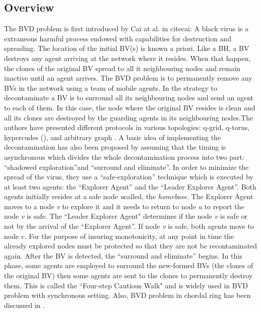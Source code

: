 \subsection{Overview}
The BVD problem is first introduced by Cai at al. in cite{cai}: A black virus is a  extraneous harmful process endowed with capabilities for destruction and spreading. The location of the initial BV(s) is known a priori. Like a BH, a BV destroys any agent arriving at the network where it resides. When that happen, the clones of the original BV spread to all it neighbouring nodes and remain inactive until an agent arrives. The BVD problem is to permanently remove any BVs in the network using a team of mobile agents. In \cite{cai}  the strategy to decontaminate a BV is to surround all its neighbouring nodes and send an agent to each of them. In this case, the node where the original BV resides is clean and all its clones are destroyed by the guarding agents in its neighbouring nodes.The authors have presented different protocols in various topologies: q-grid, q-torus, hypercudes  (\cite{cai}), and arbitrary graph \cite{cai1}. A basic idea of implementing the decontamination has also been proposed  by   assuming that the timing is asynchronous which divides the whole decontamination process into two part: ``shadowed exploration''and ``surround and eliminate''. In order to minimize the spread of the virus, they use a ``safe-exploration'' technique which is executed by at least two agents: the ``Explorer Agent'' and the ``Leader Explorer Agent''. Both agents  initially resides at a safe node {\em u}called, the {\em homebase}. The Explorer Agent moves to a node {\em v} to explore it and it needs to return to node {\em u} to report the node {\em v} is safe. The ``Leader Explorer Agent" determines if the node {\em v} is safe or not by the arrival of the ``Explorer Agent''. If node {\em v} is safe, both agents move to node $v$. For the purpose of insuring monotonicity, at any point in time the already explored nodes must be protected so that they are not be recontaminated again. After the BV is detected, the ``surround and eliminate'' begins. In this phase, some agents are employed to surround the new-formed BVs (the clones of the original BV) then some agents are sent to the clones to permanently destroy them. This is called the ``Four-step Cautious Walk" and is widely used in BVD problem with synchronous setting. Also, BVD problem in chordal ring has been discussed in
\cite{alotaibi}.

